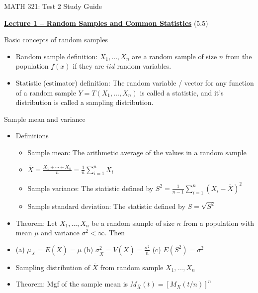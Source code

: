 \documentclass{article}
\newcommand{\bu}[1]{\textbf{\ul{#1}}}				%
\newcommand{\vecn}[2]{#1_1, \ldots, #1_{#2}}	%
\begin{document}
\begin{center}
{\Huge MATH 321: Test 2 Study Guide}

\end{center}

\bigskip\bigskip

{\large \bu{Lecture 1 -- Random Samples and Common Statistics}} (5.5)\bigskip

Basic concepts of random samples
\begin{itemize}
    \item Random sample definition: $\vecn{X}{n}$ are a random sample of size $n$ from the population $f(x)$ if they are $iid$ random variables.
    \item Statistic (estimator) definition: The random variable / vector for any function of a random sample $Y = T(\vecn{X}{n})$ is called a statistic, and it's distribution is called a sampling distribution.
\end{itemize}\bigskip

Sample mean and variance
\begin{itemize}
    \item Definitions
    \begin{itemize}
        \item Sample mean: The arithmetic average of the values in a random sample
        \item[] $\displaystyle \bar{X} = \frac{X_1 + \cdots + X_n}{n} = \frac{1}{n} \sum_{i = 1}^n X_i$
        \item Sample variance: The statistic defined by $\displaystyle S^2 = \frac{1}{n - 1} \sum_{i = 1}^n (X_i - \bar{X})^2$
        \item Sample standard deviation: The statistic defined by $S = \sqrt{S^2}$
    \end{itemize}
    \item Theorem: Let $\vecn{X}{n}$ be a random sample of size $n$ from a population with mean $\mu$ and variance $\sigma^2 < \infty$. Then
    \item[] (a) $\mu_{\bar{X}} = E(\bar{X}) = \mu$ \hspace{20pt} (b) $\sigma_{\bar{X}}^2 = V(\bar{X}) = \frac{\sigma^2}{n}$ \hspace{20pt} (c) $E(S^2) = \sigma^2$
    \item Sampling distribution of $\bar{X}$ from random sample $\vecn{X}{n}$
    \item[] Theorem: Mgf of the sample mean is $M_{\bar{X}}(t) = [M_X(t / n)]^n$
\end{itemize}\bigskip
     
\end{document}

